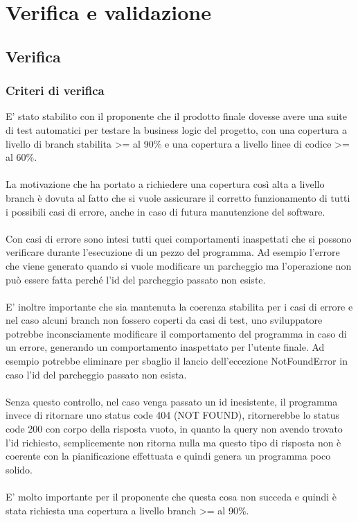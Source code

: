 
\chapter{Verifica e validazione}
\label{cap:verifica-e-validazione}

\section{Verifica}
\subsection{Criteri di verifica}
E' stato stabilito con il proponente che il prodotto finale dovesse avere 
una suite di test automatici per testare la business logic del progetto,
con una copertura a livello di branch stabilita >= al 90\% e una copertura
a livello linee di codice >= al 60\%.
\\\\
La motivazione che ha portato a richiedere una copertura così alta a livello
branch è dovuta al fatto che si vuole assicurare il corretto funzionamento di 
tutti i possibili casi di errore, anche in caso di futura manutenzione del software.
\\\\
Con casi di errore sono intesi tutti quei comportamenti inaspettati che si possono verificare
durante l'esecuzione di un pezzo del programma. Ad esempio l'errore che viene generato quando 
si vuole modificare un parcheggio ma l'operazione non può essere fatta perché l'id del
parcheggio passato non esiste.
\\\\
E' inoltre importante che sia mantenuta la coerenza stabilita per i casi di errore e
nel caso alcuni branch non fossero coperti da casi di test, uno sviluppatore potrebbe
inconsciamente modificare il comportamento del programma in caso di un errore, generando
un comportamento inaspettato per l'utente finale. Ad esempio potrebbe eliminare per sbaglio
il lancio dell'eccezione NotFoundError in caso l'id del parcheggio passato non esista.
\\\\
Senza questo controllo, nel caso venga passato un id inesistente, il programma invece
di ritornare uno status code 404 (NOT FOUND), ritornerebbe lo status code 200 con corpo
della risposta vuoto, in quanto la query non avendo trovato l'id richiesto, semplicemente non
ritorna nulla ma questo tipo di risposta non è coerente con la pianificazione effettuata
e quindi genera un programma poco solido.
\\\\
E' molto importante per il proponente che questa cosa non succeda e quindi è stata richiesta
una copertura a livello branch >= al 90\%.

